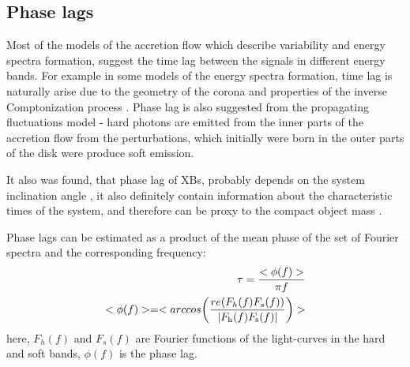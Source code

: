 \documentclass[a4paper,fleqn,usenatbib]{mnras}
\begin{document}


\subsection{Phase lags}
    Most of the models of the accretion flow which describe variability and energy spectra formation, suggest the time lag between the signals in different energy bands. 
For example in some models of the energy spectra formation, time lag is naturally arise due to the geometry of the corona and properties of the inverse Comptonization process \citep[see, e.g.][]{kotov01}.
Phase lag is also suggested from the propagating fluctuations model - hard photons are emitted from the inner parts of the accretion flow from the perturbations, which initially were born in the outer parts of the disk were produce soft emission.  

It also was found, that phase lag of XBs, probably depends on the system inclination angle \citep{eijeden17}, it also definitely contain information about the characteristic times of the system, and therefore can be proxy to the compact object mass \citep{}. 

Phase lags can be estimated as a product of the mean phase of the set of Fourier spectra and the corresponding frequency:
\begin{equation}
        \begin{split}
                \tau = \frac{<\phi(f)>}{\pi f}\\
                <\phi(f)> = <arccos{\left(\frac{re(F_h(f)F_s(f))}{|F_{\rm h}(f) F_{\rm s}(f)|}\right)}>
        \end{split}
\end{equation}
here, $F_h(f)$ and $F_s(f)$ are Fourier functions of the light-curves in the hard and soft bands, $\phi(f)$ is the phase lag. 
\end{document}
